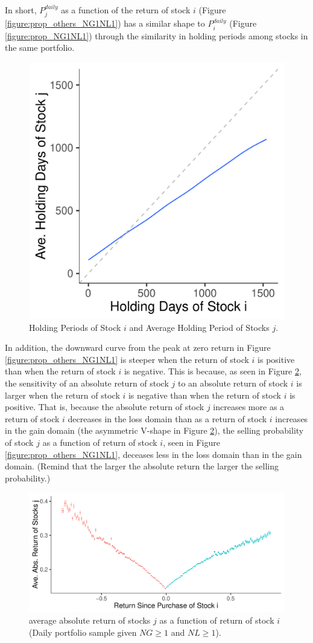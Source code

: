 \documentclass[11pt, a4paper]{article}
\begin{document}
In short, $P^{daily}_{j}$ as a function of the return of stock $i$ (Figure \ref{figure:prop_others_NG1NL1}) has a similar shape to $P^{daily}_{i}$ (Figure \ref{figure:prop_NG1NL1}) through the similarity in holding periods among stocks in the same portfolio. 

\begin{figure}[H]
	\centering
	\includegraphics[width=0.5\columnwidth]{barc_holding_days_i_j_NG1_NL1.pdf}
	\caption{Holding Periods of Stock $i$ and Average Holding Period of Stocks $j$.}
	\label{figure:holding_days_i_j_NG1NL1}
\end{figure}


In addition, the downward curve from the peak at zero return in Figure \ref{figure:prop_others_NG1NL1} is steeper when the return of stock $i$ is positive than when the return of stock $i$ is negative. This is because, as seen in Figure \ref{figure:ret_i_abs_j_NG1NL1}, the sensitivity of an absolute return of stock $j$ to an absolute return of stock $i$ is larger when the return of stock $i$ is negative than when the return of stock $i$ is positive. 
That is, because the absolute return of stock $j$ increases more as a return of stock $i$ decreases in the loss domain than as a return of stock $i$ increases in the gain domain (the asymmetric V-shape in Figure \ref{figure:ret_i_abs_j_NG1NL1}), the selling probability of stock $j$ as a function of return of stock $i$, seen in Figure \ref{figure:prop_others_NG1NL1}, deceases less in the loss domain than in the gain domain.
(Remind that the larger the absolute return the larger the selling probability.)  


\begin{figure}[H]
	\centering
	\includegraphics[width=0.8\columnwidth]{barc_R_i_abs_R_j_NG1_NL1.pdf}
	\caption{average absolute return of stocks $j$ as a function of return of stock $i$ (Daily portfolio sample given $NG\geq1$ and $NL\geq1$).}
	\label{figure:ret_i_abs_j_NG1NL1}
\end{figure}
\end{document}
